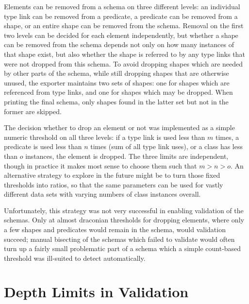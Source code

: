 
Elements can be removed from a schema on three different levels:
an individual type link can be removed from a predicate, %
a predicate can be removed from a shape,
or an entire shape can be removed from the schema.
Removal on the first two levels can be decided for each element independently,
but whether a shape can be removed from the schema depends not only on how many instances of that shape exist,
but also whether the shape is referred to by any type links that were not dropped from this schema.
To avoid dropping shapes which are needed by other parts of the schema,
while still dropping shapes that are otherwise unused,
the exporter maintains two sets of shapes:
one for shapes which are referenced from type links,
and one for shapes which may be dropped.
When printing the final schema, only shapes found in the latter set but not in the former are skipped.

The decision whether to drop an element or not
was implemented as a simple numeric threshold on all three levels:
if a type link is used less than $m$ times, %
a predicate is used less than $n$ times (sum of all type link uses),
or a class has less than $o$ instances,
the element is dropped.
The three limits are independent,
though in practice it makes most sense to choose them such that $m > n > o$.
An alternative strategy to explore in the future might be
to turn those fixed thresholds into ratios,
so that the same parameters can be used for vastly different data sets
with varying numbers of class instances overall.

Unfortunately, this strategy was not very successful in enabling validation of the schemas.
Only at almost draconian thresholds for dropping elements,
where only a few shapes and predicates would remain in the schema,
would validation succeed;
manual bisecting of the schemas which failed to validate
would often turn up a fairly small problematic part of a schema
which a simple count-based threshold was ill-suited to detect automatically.

\section{Depth Limits in Validation}
\label{sec:RDF2Graph+Wikidata:depth-limit}

